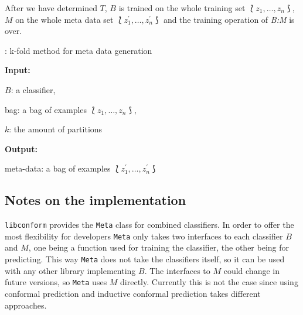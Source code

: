 \documentclass[twoside,11pt]{article}
\def\libconform{\texttt{libconform}}
\begin{document}
After we have determined $T$, $B$ is trained on the whole
training set $\Lbag z_1,\dots,z_n \Rbag$, $M$ on the
whole meta data set
$\Lbag z^{\prime}_1,\dots,z^{\prime}_n \Rbag$ and the
training operation of \textit{B:M} is over.

\begin{algorithm}
  \caption{: k-fold method for meta data generation}
  \label{alg:kfoldmeta}

  \textbf{Input:}

  \quad $B$: a classifier,

  \quad bag: a bag of examples $\Lbag z_1,\dots,z_n \Rbag$,

  \quad $k$: the amount of partitions

  \textbf{Output:}

  \quad meta-data: a bag of examples
    $\Lbag z^{\prime}_1,\dots,z^{\prime}_n \Rbag$

  \begin{algorithmic}[1]
      \ENDFOR
    \ENDFOR
  \end{algorithmic}
\end{algorithm}

\subsection*{Notes on the implementation}

\libconform{} provides the \texttt{Meta} class for
combined classifiers. In order to offer the most
flexibility for developers \texttt{Meta} only takes two
interfaces to each classifier $B$ and $M$, one being a
function used for training the classifier, the other being
for predicting. This way \texttt{Meta} does not take the
classifiers itself, so it can be used with any other
library implementing $B$. The interfaces to $M$ could
change in future versions, so \texttt{Meta} uses $M$
directly. Currently this is not the case since using
conformal prediction and inductive conformal prediction
takes different approaches.
\end{document}
